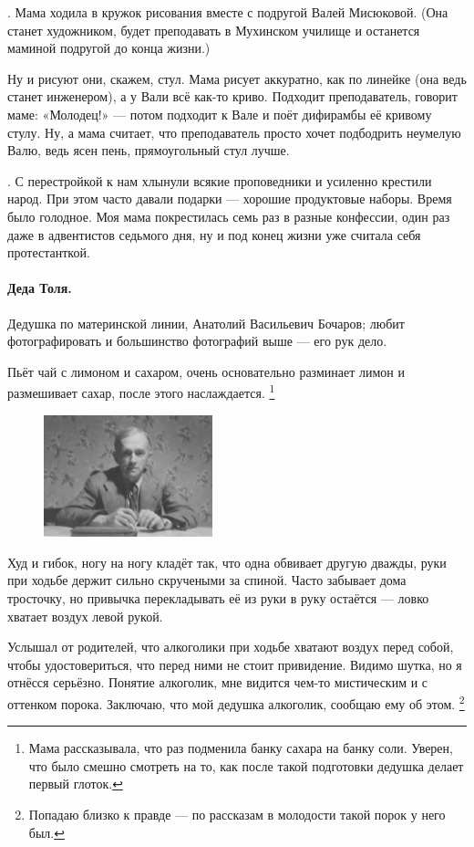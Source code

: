 \documentclass{book}
\begin{document}
.
Мама ходила в кружок рисования вместе с подругой Валей Мисюковой.
(Она станет художником, будет преподавать в Мухинском училище и останется маминой подругой до конца жизни.)

Ну и рисуют они, скажем, стул.
Мама рисует аккуратно, как по линейке (она ведь станет инженером), а у Вали всё как-то криво.
Подходит преподаватель, говорит маме: «Молодец!» ---
потом подходит к Вале и поёт дифирамбы её кривому стулу.
Ну, а мама считает, что преподаватель просто хочет подбодрить неумелую Валю, ведь ясен пень, прямоугольный стул лучше.

.
С перестройкой к нам хлынули всякие проповедники и усиленно крестили народ.
При этом часто давали подарки --- хорошие продуктовые наборы.
Время было голодное.
Моя мама покрестилась семь раз в разные конфессии, один раз даже в адвентистов седьмого дня,
ну и под конец жизни уже считала себя протестанткой.

\paragraph{Деда Толя.}
Дедушка по материнской линии,
Анатолий Васильевич Бочаров; любит фотографировать и большинство фотографий выше --- его рук дело.

Пьёт чай с лимоном и сахаром, очень основательно разминает лимон и размешивает сахар, после этого наслаждается.%
\footnote{Мама рассказывала, что раз подменила банку сахара на банку соли.
Уверен, что было смешно смотреть на то, как после такой подготовки дедушка делает первый глоток.}

\begin{figure}
\vskip-0mm
\centering
\includegraphics[width=49mm,angle=0]{pics/deda-tolya}
\end{figure}

Худ и гибок, ногу на ногу кладёт так, что одна обвивает другую дважды,
руки при ходьбе держит сильно скручеными за спиной.
Часто забывает дома тросточку, но привычка перекладывать её из руки в руку остаётся --- ловко хватает воздух левой рукой.

Услышал от родителей, что алкоголики при ходьбе хватают воздух перед собой, чтобы удостовериться,
что перед ними не стоит привидение.
Видимо шутка, но я отнёсся серьёзно.
Понятие алкоголик, мне видится чем-то мистическим и с оттенком порока.
Заключаю, что мой дедушка алкоголик, сообщаю ему об этом.%
\footnote{Попадаю близко к правде --- по рассказам в молодости такой порок у него был.}
\end{document}
